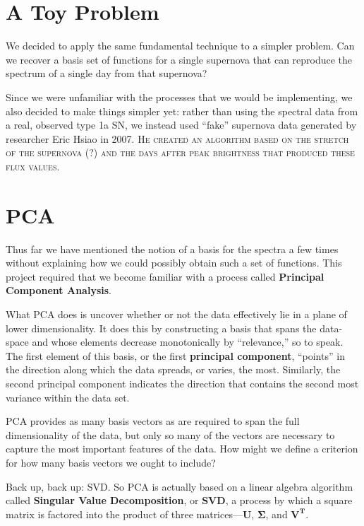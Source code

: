 \documentclass{article}
\newcommand{\mtx}[1]{$\mathbf{#1}$}
\newcommand{\defn}[1]{\textbf{#1}}
\begin{document}
\vspace{5mm}


  \section{A Toy Problem}
  \label{sec:hsiao}
  We decided to apply the same fundamental technique to a simpler
  problem.  Can we recover a basis set of functions for a single
  supernova that can reproduce the spectrum of a single day from that
  supernova?

  Since we were unfamiliar with the processes that we would be
  implementing, we also decided to make things simpler yet: rather
  than using the spectral data from a real, observed type 1a SN, we
  instead used ``fake'' supernova data generated by researcher Eric
  Hsiao in 2007.  \textsc{He created an algorithm based on the stretch
    of the supernova (?) and the days after peak brightness that
    produced these flux values.}

  \section{PCA}
  \label{sec:pca}

  Thus far we have mentioned the notion of a basis for the spectra a
  few times without explaining how we could possibly obtain such a set
  of functions.  This project required that we become familiar with a
  process called \defn{Principal Component Analysis}.

  What PCA does is uncover whether or not the data effectively lie in
  a plane of lower dimensionality.  It does this by constructing a
  basis that spans the data-space and whose elements decrease
  monotonically by ``relevance,'' so to speak.  The first element of
  this basis, or the first \defn{principal component}, ``points'' in
  the direction along which the data spreads, or varies, the
  most.  Similarly, the second principal component indicates the
  direction that contains the second most variance within the data
  set.

  PCA provides as many basis vectors as are required to span the full
  dimensionality of the data, but only so many of the vectors are
  necessary to capture the most important features of the data.  How
  might we define a criterion for how many basis vectors we ought to
  include?

  Back up, back up: SVD.  So PCA is actually based on a linear algebra
  algorithm called \defn{Singular Value Decomposition}, or \defn{SVD},
  a process by which a square matrix is factored into the product of
  three matrices---\mtx{U}, \mtx{\Sigma}, and \mtx{V^{T}}.
  
\end{document}
